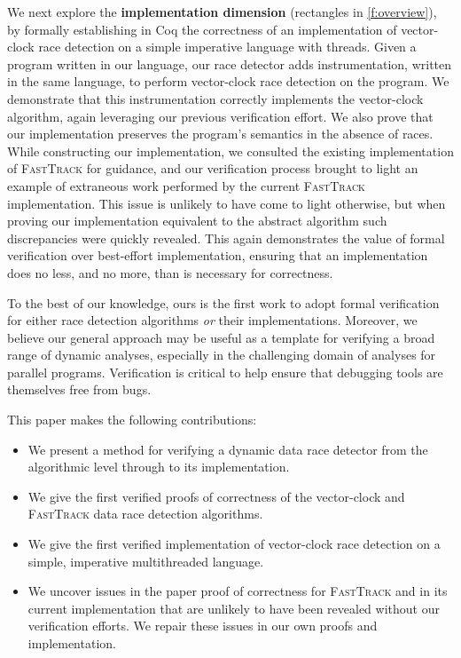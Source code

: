 \documentclass[preprint, 10pt]{sigplanconf}
\newcommand{\FT}{\textsc{FastTrack}\xspace}
\begin{document}
We next explore the \textbf{implementation dimension} (rectangles in \autoref{f:overview}), by formally establishing in Coq the correctness of an implementation of vector-clock race detection on a simple imperative language with threads. Given a program written in our language, our race detector adds instrumentation, written in the same language, to perform vector-clock race detection on the program. We demonstrate that this instrumentation correctly implements the vector-clock algorithm, again leveraging our previous verification effort. We also prove that our implementation preserves the program's semantics in the absence of races. While constructing our implementation, we consulted the existing implementation of \FT for guidance, and our verification process brought to light an example of extraneous work performed by the current \FT implementation. This issue is unlikely to have come to light otherwise, but when proving our implementation equivalent to the abstract algorithm such discrepancies were quickly revealed. This again demonstrates the value of formal verification over best-effort implementation, ensuring that an implementation does no less, and no more, than is necessary for correctness.

To the best of our knowledge, ours is the first work to adopt formal verification for either race detection algorithms \emph{or} their implementations. Moreover, we believe our general approach may be useful as a template for verifying a broad range of dynamic analyses, especially in the challenging domain of analyses for parallel programs. Verification is critical to help ensure that debugging tools are themselves free from bugs.

This paper makes the following contributions:
\begin{itemize}
\item We present a method for verifying a dynamic data race detector from the algorithmic level through to its implementation.
\item We give the first verified proofs of correctness of the vector-clock and \FT data race detection algorithms.
\item We give the first verified implementation of vector-clock race detection on a simple, imperative multithreaded language.
\item We uncover issues in the paper proof of correctness for \FT and in its current implementation that are unlikely to have been revealed without our verification efforts. We repair these issues in our own proofs and implementation.
\end{itemize}
\end{document}

